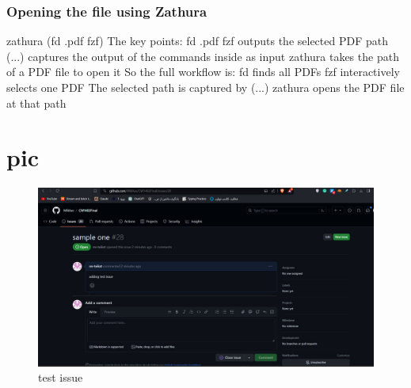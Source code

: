 \documentclass [ titlepage ]{article}
\begin{document}
\subsubsection{ Opening the file using Zathura}
zathura \textdollar (fd .pdf \textbar \space fzf) \newline
The key points: \newline
fd .pdf \textbar \space fzf outputs the selected PDF path \newline
\textdollar (...) captures the output of the commands inside as input \newline
zathura takes the path of a PDF file to open it \newline
So the full workflow is: \newline
fd finds all PDFs \newline
fzf interactively selects one PDF \newline
The selected path is captured by \textdollar (...) \newline
zathura opens the PDF file at that path \newline


\newpage

\section{pic}
\begin{figure}[h]
  \centering
  \includegraphics[width=1\textwidth]{photo.jpg}
  \caption{test issue}

\end{figure}
\end{document}

